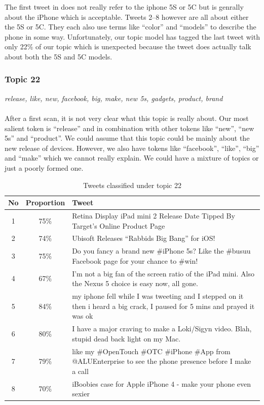 The first tweet in  does not really refer to the iphone 5S or 5C but
is genrally about the iPhone which is acceptable. Tweets 2--8 however are all about either the 5S or
5C. They each also use terms like ``color'' and ``models'' to describe the phone in some way.
Unfortunately, our topic model has tagged the last tweet with only 22\% of our topic which is
unexpected because the tweet does actually talk about both the 5S and 5C models.


\subsubsection{Topic 22}
\label{sec:topic-22}
\textit{release, like, new, facebook, big, make, new 5s, gadgets, product, brand}\\\\
After a first scan, it is not very clear what this topic is really about. Our most salient token is
``release'' and in combination with other tokens like ``new'', ``new 5s'' and ``product''. We could
assume that this topic could be mainly about the new release of devices. However, we also have
tokens like ``facebook'', ``like'', ``big'' and ``make'' which we cannot really explain. We could
have a mixture of topics or just a poorly formed one.

\begin{table}[H]
  \begin{tabular}{c c p{13cm}} \toprule
    No & Proportion & Tweet \\ \midrule
    1  & 75\%       & Retina Display iPad mini 2 Release Date Tipped By Target's Online Product Page \\ \midrule
    2  & 74\%       & Ubisoft Releases ``Rabbids Big Bang'' for iOS! \\ \midrule
    3  & 75\%       & Do you fancy a brand new \#iPhone 5s? Like the \#busuu Facebook page for your chance to \#win! \\  \midrule
    4  & 67\%       & I'm not a big fan of the screen ratio of the iPad mini. Also the Nexus 5 choice is easy now, all gone. \\  \midrule
    5  & 84\%       & my iphone fell while I was tweeting and I stepped on it then i heard a big crack, I paused for 5 mins and prayed it was ok \\  \midrule
    6  & 80\%       & I have a major craving to make a Loki/Sigyn video. Blah, stupid dead back light on my Mac. \\  \midrule
    7  & 79\%       & like my \#OpenTouch \#OTC \#iPhone \#App from @ALUEnterprise to see the phone presence before I make a call \\  \midrule
    8  & 70\%       & iBoobies case for Apple iPhone 4 - make your phone even sexier \\  \bottomrule
  \end{tabular}
  \caption{Tweets classified under topic 22}
  \label{tab:topic-22-tweets}
\end{table}

